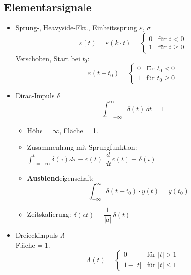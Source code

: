   \subsection{Elementarsignale}
  \begin{mdframed}[style=exercise]
      \begin{itemize}[leftmargin=*]
          \item{Sprung-, Heavyside-Fkt., Einheitssprung $\varepsilon$, $\sigma$}
          \[ \varepsilon(t) = \varepsilon(k\cdot t) = 
             \begin{cases}
                 0 & \text{f\"ur } t < 0\\
                 1 & \text{f\"ur } t \geq 0
             \end{cases}
          \]
Verschoben, Start bei $t_0$:
        \[ \varepsilon(t-t_0) = 
          \begin{cases}
          	0 & \text{f\"ur } t_0 < 0\\
          	1 & \text{f\"ur } t_0 \geq 0
          \end{cases}
          \]
          \item{Dirac-Impuls $\delta$}
          \[
              \int_{t=-\infty}^{\infty} \delta(t) \, dt = 1
          \]
          \begin{itemize}
              \item Höhe = $\infty$, Fläche = 1.
              \item{Zusammenhang mit Sprungfunktion:}\\
                  $\boxed{\int_{\tau=-\infty}^{t}\delta(\tau)d\tau =
                  \varepsilon(t)}$
                  $\boxed{\dfrac{d}{dt}\varepsilon(t) =
                  \delta(t)}$
              \item{\textbf{Ausblend}eigenschaft}:
                  \[
                      \int_{-\infty}^{\infty}\delta(t-t_0)\cdot y(t) = y(t_0)
                  \]
              \item{Zeitskalierung: }
                  $\delta(at)=\dfrac{1}{\lvert a\rvert}\,\delta(t)$
          \end{itemize}
          \item{Dreieckimpuls $\Lambda$}\\
          Fläche = 1.
          \[ \Lambda(t) =
             \begin{cases}
                 0 & \text{f\"ur } \vert t\rvert > 1\\
                 1-|t| & \text{f\"ur } \vert t\rvert \leq 1
             \end{cases}
\]
\end{itemize}
\end{mdframed}
